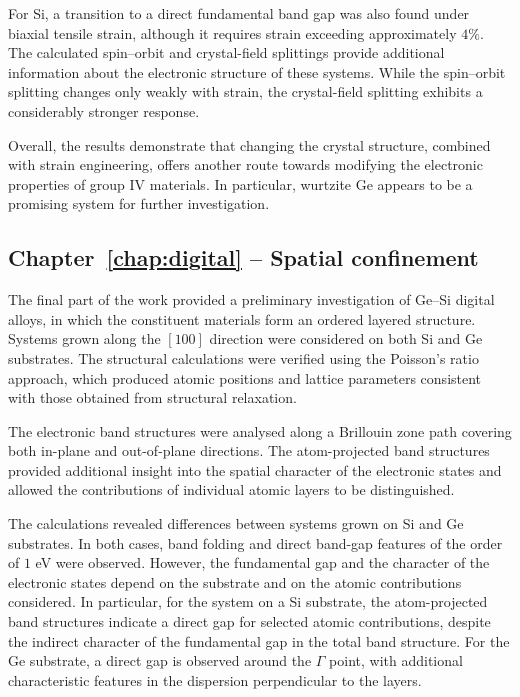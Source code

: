 For Si, a transition to a direct fundamental band gap was also found under biaxial tensile strain, although it requires strain exceeding approximately $4\%$. The calculated spin--orbit and crystal-field splittings provide additional information about the electronic structure of these systems. While the spin--orbit splitting changes only weakly with strain, the crystal-field splitting exhibits a considerably stronger response.

Overall, the results demonstrate that changing the crystal structure, combined with strain engineering, offers another route towards modifying the electronic properties of group IV materials. In particular, wurtzite Ge appears to be a promising system for further investigation.

\ornament

\subsection*{Chapter~\ref{chap:digital} -- Spatial confinement}

The final part of the work provided a preliminary investigation of Ge--Si digital alloys, in which the constituent materials form an ordered layered structure. Systems grown along the $[100]$ direction were considered on both Si and Ge substrates. The structural calculations were verified using the Poisson's ratio approach, which produced atomic positions and lattice parameters consistent with those obtained from structural relaxation.

The electronic band structures were analysed along a Brillouin zone path covering both in-plane and out-of-plane directions. The atom-projected band structures provided additional insight into the spatial character of the electronic states and allowed the contributions of individual atomic layers to be distinguished.

The calculations revealed differences between systems grown on Si and Ge substrates. In both cases, band folding and direct band-gap features of the order of $1$ eV were observed. However, the fundamental gap and the character of the electronic states depend on the substrate and on the atomic contributions considered. In particular, for the system on a Si substrate, the atom-projected band structures indicate a direct gap for selected atomic contributions, despite the indirect character of the fundamental gap in the total band structure. For the Ge substrate, a direct gap is observed around the $\Gamma$ point, with additional characteristic features in the dispersion perpendicular to the layers.

